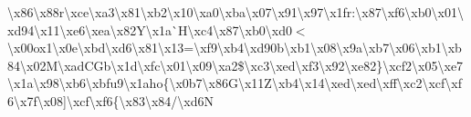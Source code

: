 \textbackslash{}x86\textbackslash{}x88r\textquotesingle{}\textbackslash{}xce\textbackslash{}xa3\textbackslash{}x81\textbackslash{}xb2\textbackslash{}x10\textbackslash{}xa0\textbackslash{}xba\textbackslash{}x07\textbackslash{}x91\textbackslash{}x97\textbackslash{}x1fr\+:\textbackslash{}x87\textbackslash{}xf6\textbackslash{}xb0\textbackslash{}x01\textbackslash{}xd94\textbackslash{}x11\textbackslash{}xe6\textbackslash{}xea\textbackslash{}x82\+Y\textbackslash{}x1a\`{}\+H\textbackslash{}xc4\textbackslash{}x87\textbackslash{}xb0\textbackslash{}xd0$<$\textbackslash{}x00ox1\textbackslash{}x0e\textbackslash{}xbd\textbackslash{}xd6\textbackslash{}x81\textbackslash{}x13=\textbackslash{}xf9\textbackslash{}xb4\textbackslash{}xd90b\textbackslash{}xb1\textbackslash{}x08\textbackslash{}x9a\textbackslash{}xb7\textbackslash{}x06\textbackslash{}xb1\textbackslash{}xb84\textbackslash{}x02\+M\textbackslash{}xad\+C\+Gb\textbackslash{}x1d\textbackslash{}xfc\textbackslash{}x01\textbackslash{}x09\textbackslash{}xa2\$\textbackslash{}xc3\textbackslash{}xed\textbackslash{}xf3\textbackslash{}x92\textbackslash{}xe82\}\textbackslash{}xcf2\textbackslash{}x05\textbackslash{}xe7\textbackslash{}x1a\textbackslash{}x98\textbackslash{}xb6\textbackslash{}xbfu9\textbackslash{}x1aho\{\textbackslash{}x0b7\textbackslash{}x86\+G\textbackslash{}x11\+Z\textbackslash{}xb4\textbackslash{}x14\textbackslash{}xed\textbackslash{}xed\textbackslash{}xff\textbackslash{}xc2\textbackslash{}xcf\textbackslash{}xf6\textbackslash{}x7f\textbackslash{}x08\mbox{]}\textbackslash{}xcf\textbackslash{}xf6\{\textbackslash{}x83\textbackslash{}x84/\textbackslash{}xd6\+N 